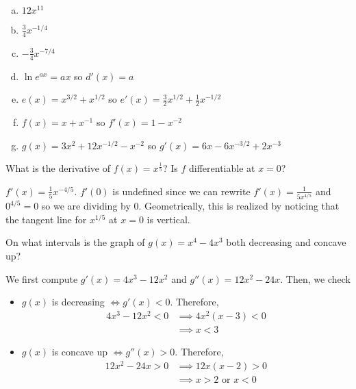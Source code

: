 \documentclass[11pt]{exam}
\begin{document}
\begin{questions}
  \begin{solution}
    \begin{enumerate}[(a)]
    \item \(12x^{11}\)
    \item \(\frac{3}{4}x^{-1/4}\)
    \item \(-\frac{3}{4}x^{-7/4}\)
    \item \(\ln e^{ax} = ax\) so \(d'(x) = a\)
    \item \(e(x) = x^{3/2}+x^{1/2}\) so \(e'(x) = \frac{3}{2}x^{1/2}+\frac{1}{2}x^{-1/2}\)
    \item \(f(x) = x+x^{-1}\) so \(f'(x) = 1-x^{-2}\)
    \item \(g(x) = 3x^2+12x^{-1/2}-x^{-2}\) so \(g'(x) = 6x-6x^{-3/2}+2x^{-3}\)
    \end{enumerate}
  \end{solution}
\question What is the derivative of \(f(x) = x^{\frac{1}{5}}\)? Is
  \(f\) differentiable at \(x=0\)?
  \begin{solution}
    \(f'(x) = \frac{1}{5}x^{-4/5}\). \(f'(0)\) is undefined since we
    can rewrite \(f'(x) = \frac{1}{5 x^{4/5}}\) and \(0^{4/5} = 0\) so
    we are dividing by \(0\). Geometrically, this is realized by
    noticing that the tangent line for \(x^{1/5}\) at \(x=0\) is vertical.
  \end{solution}
\question On what intervals is the graph of $g(x) = x^4-4x^3$ both decreasing and concave up?
  \begin{solution}
    We first compute \(g'(x) = 4x^3-12x^2\) and \(g''(x) =
    12x^2-24x\). Then, we check
    \begin{itemize}
    \item \(g(x)\) is decreasing \(\iff g'(x) < 0\). Therefore,
      \begin{align*}
        4x^3-12x^2 < 0
        & \implies 4x^2(x-3) < 0 \\
        & \implies x < 3
      \end{align*}
    \item \(g(x)\) is concave up \(\iff g''(x) > 0\). Therefore,
      \begin{align*}
        12x^2-24x > 0
        & \implies 12x(x-2) > 0 \\
        & \implies x > 2 \text{ or } x<0

\end{align*}
\end{itemize}
\end{solution}
\end{questions}
\end{document}
